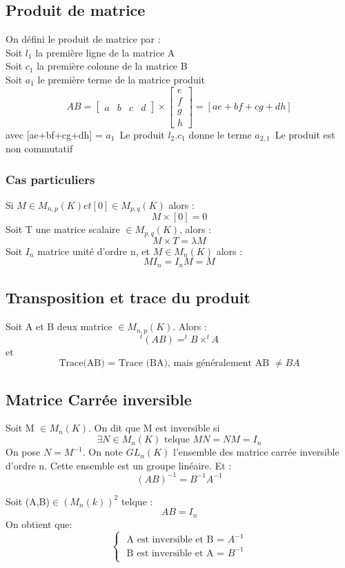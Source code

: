 \subsection{Produit de matrice}
\begin{de}
On défini le produit de matrice par : \\
Soit $l_1$ la première ligne de la matrice A\\
Soit $c_1$ la première colonne de la matrice B\\
Soit $a_1$ le première terme de la matrice produit\\
$$AB = \begin{bmatrix}
a & b & c & d
\end{bmatrix}\times\begin{bmatrix}
e \\
f \\
g \\
h \end{bmatrix} = [ae+bf+cg+dh]$$$$$$
avec [ae+bf+cg+dh] = $a_1$\
Le produit $l_2.c_1$ donne le terme $a_{2,1}$\
Le produit est non commutatif
\end{de}
\subsubsection{Cas particuliers}
Si $M \in M_{n,p}(K) et [0] \in M_{p,q}(K) $ alors :
$$M \times [0] = 0$$
Soit T une matrice scalaire $\in M_{p,q}(K)$, alors :
$$M \times T = \lambda M$$
Soit $I_n$ matrice unité d'ordre n, et $M \in M_{n}(K)$ alors :
$$MI_n=I_nM=M$$ 
\subsection{Transposition et trace du produit}
Soit A et B deux matrice $\in M_{n,p}(K)$. Alors :
$$^t(AB) = ^tB\times^tA$$
et 
$$\mbox{Trace(AB) = Trace (BA), mais généralement AB }\neq BA$$
\subsection{Matrice Carrée inversible}
\begin{de}
 Soit M $\in M_n(K)$. On dit que M est inversible si 
$$\exists N \in M_n(K) \mbox{ telque } MN = NM = I_n $$
On pose $N = M^{-1}$. On note $GL_n(K)$ l'ensemble des matrice carrée inversible d'ordre n. Cette ensemble est un groupe linéaire. Et :
$$(AB)^{-1} = B^{-1}A^{-1}$$
\end{de}
\begin{prop}
Soit (A,B)$\in (M_n(k))^2$ telque : $$AB = I_n$$
On obtient que:
\[\left\{\begin{array}{l}
   \mbox{ A est inversible et B = }A^{-1}\\
   \mbox{ B est inversible et A = }B^{-1} \\
  \end{array}\right.\]
\end{prop}

